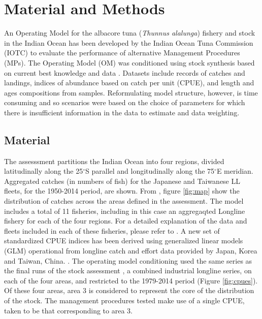 \section*{Material and Methods}

An Operating Model for the albacore tuna (\textit{Thunnus alalunga}) fishery and stock in the Indian Ocean has been developed by the Indian Ocean Tuna Commission (IOTC) to evaluate the performance of alternative Management Procedures (MPs).  The Operating Model (OM) was conditioned using stock synthesis \citep[SS3][]{MethotW2013} based on current best knowledge and data \citep{ptmt2014}. Datasets include records of catches and landings, indices of abundance based on catch per unit (CPUE), and  length and ages compositions from samples. Reformulating model structure, however, is time consuming and so scenarios were based on the choice of parameters for which there is insufficient information in the data to estimate and data weighting. 

\subsection*{Material}

The assesssment partitions the Indian Ocean into four regions, divided latitudinally along the 25$^{\circ}$S parallel and longitudinally along the 75$^{\circ}$E meridian. Aggregated catches (in numbers of fish) for the Japanese and Taiwanese LL fleets, for the 1950-2014 period, are shown. From \citep{LangleyH2016}, figure \ref{fig:map} show the distribution of catches across the areas defined in the assessment. The model includes a total of 11 fisheries, including in this case an aggregaqted Longline fishery for each of the four regions. For a detailed explanation of the data and fleets included in each of these fisheries, please refer to \citep{LangleyH2016}. A new set of standardized CPUE indices has been derived using generalized linear models (GLM) operational from longline catch and effort data provided by Japan, Korea and Taiwan, China. \citep{HoyleKL2016}. The operating model conditioning used the same series as the final runs of the stock assessment \citep{LangleyH2016}, a combined industrial longline series, on each of the four areas, and restricted to the 1979-2014 period (Figure \ref{fig:cpues}). Of these four areas, area 3 is considered to represent the core of the distribution of the stock. The management procedures tested make use of a single CPUE, taken to be that corresponding to area 3.

